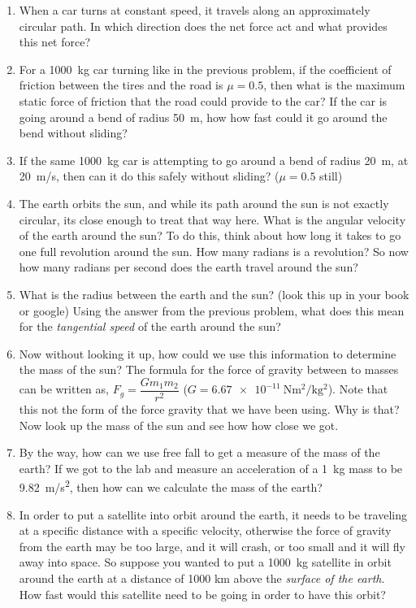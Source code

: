 \begin{enumerate}
	\item When a car turns at constant speed, it travels along an approximately circular path. In which direction does the net force act and what provides this net force?
	
	\item For a \SI{1000}{kg} car turning like in the previous problem, if the coefficient of friction between the tires and the road is $\mu=0.5$, then what is the maximum static force of friction that the road could provide to the car? If the car is going around a bend of radius \SI{50}{\meter}, how how fast could it go around the bend without sliding?
	
	\item If the same \SI{1000}{\kilogram} car is attempting to go around a bend of radius \SI{20}{\meter}, at \SI{20}{m/s}, then can it do this safely without sliding? ($\mu = 0.5$ still)
	
	\item The earth orbits the sun, and while its path around the sun is not exactly circular, its close enough to treat that way here. What is the angular velocity of the earth around the sun? To do this, think about how long it takes to go one full revolution around the sun. How many radians is a revolution? So now how many radians per second does the earth travel around the sun? 
	\item What is the radius between the earth and the sun? (look this up in your book or google) Using the answer from the previous problem, what does this mean for the \emph{tangential speed} of the earth around the sun?
	
	\bigskip
	\item Now without looking it up, how could we use this information to determine the mass of the sun?  The formula for the force of gravity between to masses can be written as, $F_g=\dfrac{G m_1 m_2}{r^2}$ ($G=\SI{6.67e-11}{\newton \meter^2/\kilogram^2}$). Note that this not the form of the force gravity that we have been using. Why is that? Now look up the mass of the sun and see how how close we got.
	
	\bigskip
	\item By the way, how can we use free fall to get a measure of the mass of the earth? If we got to the lab and measure an acceleration of a \SI{1}{\kilogram} mass to be \SI{9.82}{m/s^2}, then how can we calculate the mass of the earth?
	
	\item In order to put a satellite into orbit around the earth, it needs to be traveling at a specific distance with a specific velocity, otherwise the force of gravity from the earth may be too large, and it will crash, or too small and it will fly away into space. So suppose you wanted to put a \SI{1000}{kg} satellite in orbit around the earth at a distance of 1000 km above the \emph{surface of the earth}. How fast would this satellite need to be going in order to have this orbit?
	

\end{enumerate}
